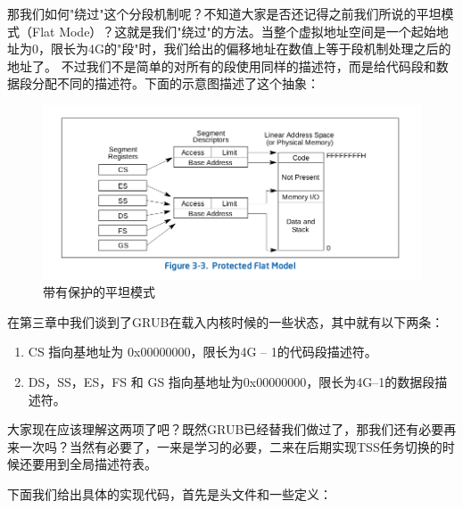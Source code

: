 \par 那我们如何"绕过"这个分段机制呢？不知道大家是否还记得之前我们所说的平坦模式（Flat Mode）？这就是我们"绕过"的方法。当整个虚拟地址空间是一个起始地址为0，限长为4G的"段"时，我们给出的偏移地址在数值上等于段机制处理之后的地址了。
不过我们不是简单的对所有的段使用同样的描述符，而是给代码段和数据段分配不同的描述符。下面的示意图描述了这个抽象：

\begin{figure}[ht]
      \centering
      \includegraphics[scale=0.5]{picture/chapt6/protected_flat_mode.png}
      \caption{带有保护的平坦模式}
\end{figure}

\par 在第三章中我们谈到了GRUB在载入内核时候的一些状态，其中就有以下两条：

\begin{mdframed}
	\begin{enumerate}
		\item CS 指向基地址为 0x00000000，限长为4G – 1的代码段描述符。
		\item DS，SS，ES，FS 和 GS 指向基地址为0x00000000，限长为4G–1的数据段描述符。
	\end{enumerate}
\end{mdframed}

\par 大家现在应该理解这两项了吧？既然GRUB已经替我们做过了，那我们还有必要再来一次吗？当然有必要了，一来是学习的必要，二来在后期实现TSS任务切换的时候还要用到全局描述符表。

\par 下面我们给出具体的实现代码，首先是头文件和一些定义：


